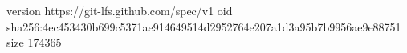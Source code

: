 version https://git-lfs.github.com/spec/v1
oid sha256:4ec453430b699c5371ae914649514d2952764e207a1d3a95b7b9956ae9e88751
size 174365

